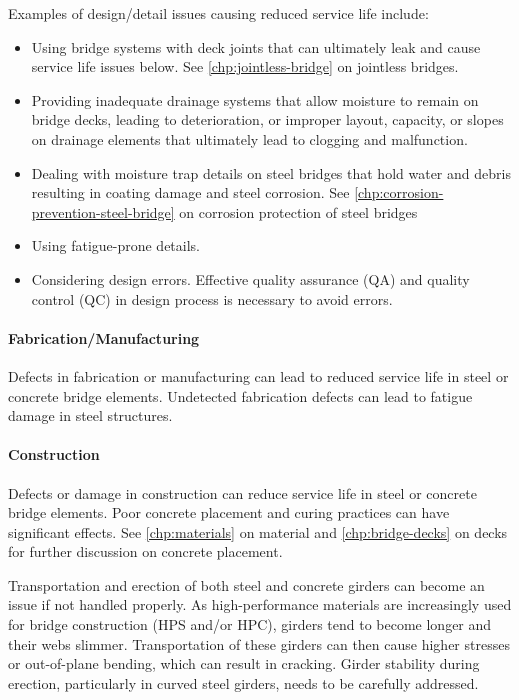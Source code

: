Examples of design/detail issues causing reduced service life include:
\begin{itemize}
  \item Using bridge systems with deck joints that can ultimately leak and cause service life issues below. See
  \cref{chp:jointless-bridge} on jointless bridges.
  \item Providing inadequate drainage systems that allow moisture to remain on bridge decks, leading to
  deterioration, or improper layout, capacity, or slopes on drainage elements that ultimately lead to clogging
  and malfunction.
  \item Dealing with moisture trap details on steel bridges that hold water and debris resulting in coating damage and
  steel corrosion. See \cref{chp:corrosion-prevention-steel-bridge} on corrosion protection of steel bridges
  \item Using fatigue-prone details.
  \item Considering design errors. Effective quality assurance (QA) and quality control (QC) in design process is
  necessary to avoid errors.
\end{itemize}

\paragraph{Fabrication/Manufacturing}
Defects in fabrication or manufacturing can lead to reduced service life in steel or concrete bridge elements.
Undetected fabrication defects can lead to fatigue damage in steel structures.

\paragraph{Construction}
Defects or damage in construction can reduce service life in steel or concrete bridge elements. Poor concrete
placement and curing practices can have significant effects. See \cref{chp:materials} on material and \cref{chp:bridge-decks} on decks for
further discussion on concrete placement.

Transportation and erection of both steel and concrete girders can become an issue if not handled properly. As
high-performance materials are increasingly used for bridge construction (HPS and/or HPC), girders tend to become
longer and their webs slimmer. Transportation of these girders can then cause higher stresses or out-of-plane
bending, which can result in cracking. Girder stability during erection, particularly in curved steel girders, needs to
be carefully addressed.


